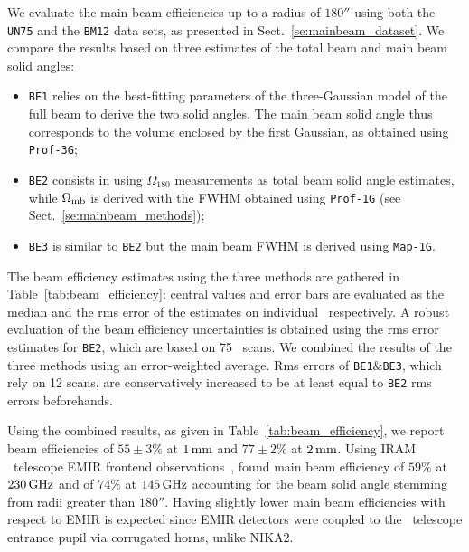 We evaluate the main beam efficiencies up to a radius of $180''$ using both the {\tt UN75} and
the {\tt BM12} data sets, as presented in
Sect.~\ref{se:mainbeam_dataset}. We compare the results based on three
estimates of the total beam and main beam solid angles: 
\begin{itemize}
  \item{{\tt BE1} relies on the best-fitting parameters of the
    three-Gaussian model of the full beam to derive the two solid
    angles. The main beam solid angle thus corresponds to the volume
    enclosed by the first Gaussian, as obtained using {\tt Prof-3G};}
  \item{{\tt BE2} consists in using $\Omega_{180}$ measurements as
    total beam solid angle estimates, while $\Omega_{\rm{mb}}$ is
    derived with the FWHM obtained using {\tt Prof-1G} (see
    Sect.~\ref{se:mainbeam_methods});}
  \item{{\tt BE3} is similar to {\tt BE2} but the main beam FWHM is
    derived using {\tt Map-1G}.}  
\end{itemize}

The beam efficiency estimates using the three methods are gathered
in Table~\ref{tab:beam_efficiency}: central values and error
bars are evaluated as the median and the rms error of the
estimates on individual \bms\ respectively. A robust evaluation of the
beam efficiency uncertainties is obtained using the rms error estimates
for {\tt BE2}, which are based on 75 \bm\ scans. We combined the
results of the three methods using an error-weighted average. Rms
errors of {\tt BE1$\&$BE3}, which rely on 12 scans, are conservatively
increased to be at least equal to {\tt BE2} rms errors beforehands.

Using the combined results, as given in
Table~\ref{tab:beam_efficiency}, we report beam efficiencies of
$55 \pm 3 \%$ at $1\,\rm{mm}$ and  $77 \pm 2 \%$ at $2\,\rm{mm}$.
{\lp Using IRAM \trentemetre\ telescope EMIR frontend
observations~\citep{Carter2012}, \citet{Kramer2013} found main
beam efficiency of $59\%$ at $230\,\rm{GHz}$ and of $74\%$ at
$145\,\rm{GHz}$ accounting for the beam solid angle stemming from
radii greater than $180''$. Having slightly lower main beam
efficiencies with respect to EMIR is expected
since EMIR detectors were coupled to the \trentemetre\ telescope
entrance pupil via corrugated horns, unlike NIKA2.} 
  
